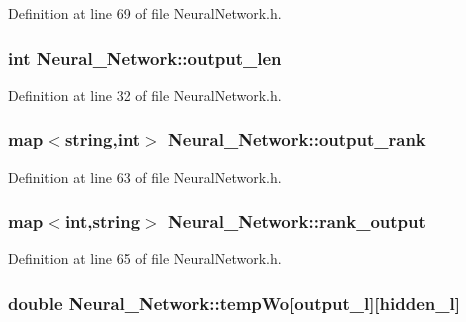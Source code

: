 Definition at line 69 of file Neural\-Network.\-h.

\hypertarget{a00003_a053d2b510e07b1f25ef112f366bc62ba}{
\subsubsection[{output\-\_\-len}]{\setlength{\rightskip}{0pt plus 5cm}int Neural\-\_\-\-Network\-::output\-\_\-len\hspace{0.3cm}{\ttfamily [private]}}}\label{d1/d7c/a00003_a053d2b510e07b1f25ef112f366bc62ba}


Definition at line 32 of file Neural\-Network.\-h.

\hypertarget{a00003_af46a9de8ef619f93fb8c0231be79163c}{
\subsubsection[{output\-\_\-rank}]{\setlength{\rightskip}{0pt plus 5cm}map$<$string,int$>$ Neural\-\_\-\-Network\-::output\-\_\-rank\hspace{0.3cm}{\ttfamily [private]}}}\label{d1/d7c/a00003_af46a9de8ef619f93fb8c0231be79163c}


Definition at line 63 of file Neural\-Network.\-h.

\hypertarget{a00003_a8e34531b701290d16068e3685f3066a4}{
\subsubsection[{rank\-\_\-output}]{\setlength{\rightskip}{0pt plus 5cm}map$<$int,string$>$ Neural\-\_\-\-Network\-::rank\-\_\-output\hspace{0.3cm}{\ttfamily [private]}}}\label{d1/d7c/a00003_a8e34531b701290d16068e3685f3066a4}


Definition at line 65 of file Neural\-Network.\-h.

\hypertarget{a00003_a1cca3513af05c6dce603fdf332b36691}{
\subsubsection[{temp\-Wo}]{\setlength{\rightskip}{0pt plus 5cm}double Neural\-\_\-\-Network\-::temp\-Wo\mbox{[}{\bf output\-\_\-l}\mbox{]}\mbox{[}{\bf hidden\-\_\-l}\mbox{]}\hspace{0.3cm}{\ttfamily [private]}}}\label{d1/d7c/a00003_a1cca3513af05c6dce603fdf332b36691}


